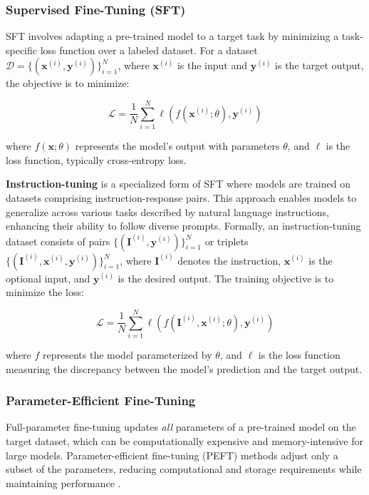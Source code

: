 \subsubsection{Supervised Fine-Tuning (SFT)}\label{app:sft}

SFT involves adapting a pre-trained model to a target task by minimizing a task-specific loss function over a labeled dataset. For a dataset \( \mathcal{D} = \{(\mathbf{x}^{(i)}, \mathbf{y}^{(i)})\}_{i=1}^N \), where \( \mathbf{x}^{(i)} \) is the input and \( \mathbf{y}^{(i)} \) is the target output, the objective is to minimize:

\[
\mathcal{L} = \frac{1}{N} \sum_{i=1}^N \ell(f(\mathbf{x}^{(i)}; \theta), \mathbf{y}^{(i)})
\]

where \( f(\mathbf{x}; \theta) \) represents the model's output with parameters \( \theta \), and \( \ell \) is the loss function, typically cross-entropy loss.

\textbf{Instruction-tuning} is a specialized form of SFT where models are trained on datasets comprising instruction-response pairs. This approach enables models to generalize across various tasks described by natural language instructions, enhancing their ability to follow diverse prompts. Formally, an instruction-tuning dataset consists of pairs \( \{(\mathbf{I}^{(i)}, \mathbf{y}^{(i)})\}_{i=1}^N \) or triplets \( \{(\mathbf{I}^{(i)}, \mathbf{x}^{(i)}, \mathbf{y}^{(i)})\}_{i=1}^N \), where \( \mathbf{I}^{(i)} \) denotes the instruction, \( \mathbf{x}^{(i)} \) is the optional input, and \( \mathbf{y}^{(i)} \) is the desired output. The training objective is to minimize the loss:

\[
\mathcal{L} = \frac{1}{N} \sum_{i=1}^N \ell(f(\mathbf{I}^{(i)}, \mathbf{x}^{(i)}; \theta), \mathbf{y}^{(i)})
\]

where \( f \) represents the model parameterized by \( \theta \), and \( \ell \) is the loss function measuring the discrepancy between the model's prediction and the target output.

\subsubsection{Parameter-Efficient Fine-Tuning} \label{app:peft}
Full-parameter fine-tuning updates \textit{all} parameters of a pre-trained model on the target dataset, which can be computationally expensive and memory-intensive for large models. Parameter-efficient fine-tuning (PEFT) methods adjust only a subset of the parameters, reducing computational and storage requirements while maintaining performance \citep{XuPARAMETEREFFICIENT2023}.

